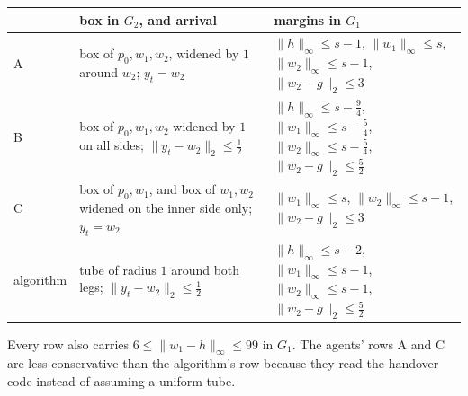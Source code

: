 \documentclass[10pt]{article}
\newcommand{\ninf}[1]{\lVert #1\rVert_\infty}
\newcommand{\ntwo}[1]{\lVert #1\rVert_2}
\begin{document}
\begin{center}\small
\begin{tabular}{@{}lp{6.2cm}p{7.6cm}@{}}\toprule
 & box in $G_2$, and arrival & margins in $G_1$ \\\midrule
A & box of $p_0,w_1,w_2$, widened by $1$ around $w_2$; $y_t=w_2$ & $\ninf{h}\le s-1$, $\ninf{w_1}\le s$, $\ninf{w_2}\le s-1$, $\ntwo{w_2-g}\le 3$ \\
B & box of $p_0,w_1,w_2$ widened by $1$ on all sides; $\ntwo{y_t-w_2}\le\tfrac12$ & $\ninf{h}\le s-\tfrac94$, $\ninf{w_1}\le s-\tfrac54$, $\ninf{w_2}\le s-\tfrac54$, $\ntwo{w_2-g}\le\tfrac52$ \\
C & box of $p_0,w_1$, and box of $w_1,w_2$ widened on the inner side only; $y_t=w_2$ & $\ninf{w_1}\le s$, $\ninf{w_2}\le s-1$, $\ntwo{w_2-g}\le 3$ \\
algorithm & tube of radius $1$ around both legs; $\ntwo{y_t-w_2}\le\tfrac12$ & $\ninf{h}\le s-2$, $\ninf{w_1}\le s-1$, $\ninf{w_2}\le s-1$, $\ntwo{w_2-g}\le\tfrac52$ \\\bottomrule
\end{tabular}
\end{center}
Every row also carries $6\le\ninf{w_1-h}\le 99$ in $G_1$. The agents' rows A and C are less conservative than the algorithm's row because they read the handover code instead of assuming a uniform tube.
\end{document}
